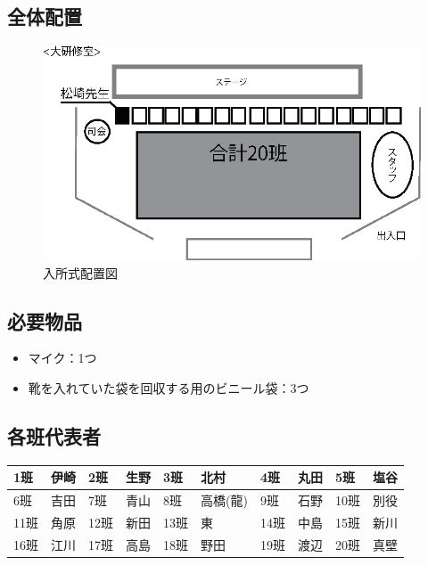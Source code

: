 \subsection{全体配置}
\begin{figure}[H]
  \begin{center}
  \includegraphics[scale=1.5]{./08/nyushoshiki.eps}
  \caption{入所式配置図}
  \label{nyusyosiki}
  \end{center}
\end{figure}


\subsection{必要物品}
\begin{itemize}
\item マイク：1つ
\item 靴を入れていた袋を回収する用のビニール袋：3つ
\end{itemize}

\clearpage

\subsection{各班代表者}
\begin{table}[htb]
  \begin{center}
  \begin{tabular}{|l|l||l|l||l|l||l|l||l|l|} \hline
  1班 & 伊崎 & 2班 & 生野 & 3班 & 北村 & 4班 & 丸田 & 5班 & 塩谷 \\ \hline
  6班 & 吉田 & 7班 & 青山 & 8班 & 高橋(龍) & 9班 & 石野 & 10班 & 別役  \\  \hline
  11班 & 角原 & 12班 & 新田 & 13班 & 東 & 14班 & 中島 & 15班 & 新川 \\ \hline
  16班 & 江川 & 17班 & 高島 & 18班 & 野田 & 19班 & 渡辺 & 20班 & 真壁 \\ \hline
    \end{tabular}
  \end{center}
\end{table}


